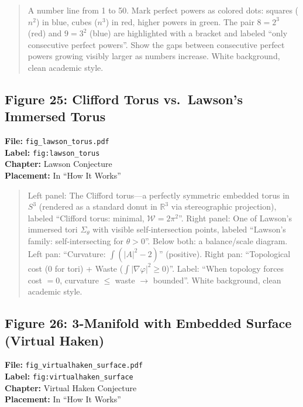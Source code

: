 \begin{quote}
A number line from 1 to 50. Mark perfect powers as colored dots: squares ($n^2$) in blue, cubes ($n^3$) in red, higher powers in green. The pair $8 = 2^3$ (red) and $9 = 3^2$ (blue) are highlighted with a bracket and labeled ``only consecutive perfect powers''. Show the gaps between consecutive perfect powers growing visibly larger as numbers increase. White background, clean academic style.
\end{quote}

\subsection*{Figure 25: Clifford Torus vs.\ Lawson's Immersed Torus}
\textbf{File:} \texttt{fig\_lawson\_torus.pdf} \\
\textbf{Label:} \texttt{fig:lawson\_torus} \\
\textbf{Chapter:} Lawson Conjecture \\
\textbf{Placement:} In ``How It Works''

\begin{quote}
Left panel: The Clifford torus---a perfectly symmetric embedded torus in $S^3$ (rendered as a standard donut in $\mathbb{R}^3$ via stereographic projection), labeled ``Clifford torus: minimal, $\mathcal{W} = 2\pi^2$''. Right panel: One of Lawson's immersed tori $\Sigma_\theta$ with visible self-intersection points, labeled ``Lawson's family: self-intersecting for $\theta > 0$''. Below both: a balance/scale diagram. Left pan: ``Curvature: $\int(|A|^2 - 2)$'' (positive). Right pan: ``Topological cost (0 for tori) + Waste ($\int|\nabla\varphi|^2 \geq 0$)''. Label: ``When topology forces cost $= 0$, curvature $\leq$ waste $\to$ bounded''. White background, clean academic style.
\end{quote}

\subsection*{Figure 26: 3-Manifold with Embedded Surface (Virtual Haken)}
\textbf{File:} \texttt{fig\_virtualhaken\_surface.pdf} \\
\textbf{Label:} \texttt{fig:virtualhaken\_surface} \\
\textbf{Chapter:} Virtual Haken Conjecture \\
\textbf{Placement:} In ``How It Works''

